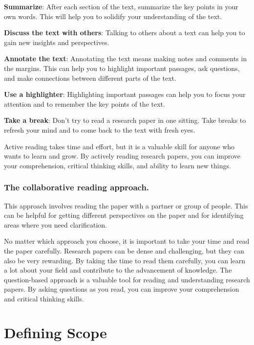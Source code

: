 \documentclass[
]{book}
\begin{document}
\textbf{Summarize}: After each section of the text, summarize the key points in your own words. This will help you to solidify your understanding of the text.

\textbf{Discuss the text with others}: Talking to others about a text can help you to gain new insights and perspectives.

\textbf{Annotate the text}: Annotating the text means making notes and comments in the margins. This can help you to highlight important passages, ask questions, and make connections between different parts of the text.

\textbf{Use a highlighter}: Highlighting important passages can help you to focus your attention and to remember the key points of the text.

\textbf{Take a break}: Don't try to read a research paper in one sitting. Take breaks to refresh your mind and to come back to the text with fresh eyes.

Active reading takes time and effort, but it is a valuable skill for anyone who wants to learn and grow. By actively reading research papers, you can improve your comprehension, critical thinking skills, and ability to learn new things.

\subsection*{The collaborative reading approach.}\label{the-collaborative-reading-approach.}

This approach involves reading the paper with a partner or group of people. This can be helpful for getting different perspectives on the paper and for identifying areas where you need clarification.

No matter which approach you choose, it is important to take your time and read the paper carefully. Research papers can be dense and challenging, but they can also be very rewarding. By taking the time to read them carefully, you can learn a lot about your field and contribute to the advancement of knowledge. The question-based approach is a valuable tool for reading and understanding research papers. By asking questions as you read, you can improve your comprehension and critical thinking skills.

\chapter{Defining Scope}\label{defining-scope}
\end{document}

